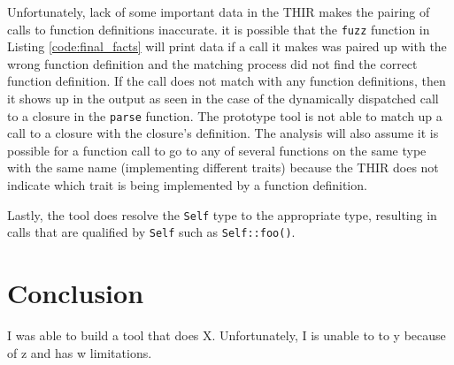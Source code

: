 \documentclass[11pt]{article}
\begin{document}
Unfortunately, lack of some important data in the THIR makes the pairing of calls to function definitions inaccurate.
it is possible that the \lstinline{fuzz} function in Listing \ref{code:final_facts} will print data if a call it makes was paired up with the wrong function definition and the matching process did not find the correct function definition.
If the call does not match with any function definitions, then it shows up in the output as seen in the case of the dynamically dispatched call to a closure in the \lstinline{parse} function.
The prototype tool is not able to match up a call to a closure with the closure's definition.
The analysis will also assume it is possible for a function call to go to any of several functions on the same type with the same name (implementing different traits) because the THIR does not indicate which trait is being implemented by a function definition.

Lastly, the tool does resolve the \lstinline{Self} type to the appropriate type, resulting in calls that are qualified by \lstinline{Self} such as \lstinline{Self::foo()}.





\section{Conclusion}
I was able to build a tool that does X.
Unfortunately, I is unable to to y because of z and has w limitations.
\end{document}
